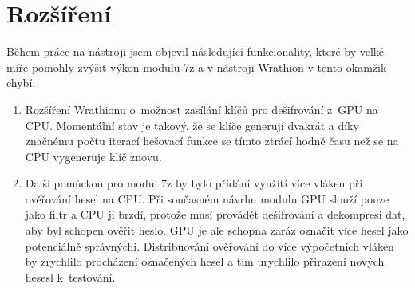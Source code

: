 \section{Rozšíření}
Během práce na nástroji jsem objevil následující funkcionality, které by velké míře pomohly
zvýšit výkon modulu 7z a v nástroji Wrathion v tento okamžik chybí.
\begin{enumerate}
   \item Rozšíření Wrathionu o~možnost zasílání klíčů pro dešifrování z~GPU na CPU. Momentální
       stav je takový, že se klíče generují dvakrát a díky značnému počtu iterací hešovací funkce
       se tímto ztrácí hodně času než se na CPU vygeneruje klíč znovu.
    \item Další pomůckou pro modul 7z by bylo přídání využítí více vláken při ověřování hesel na
	CPU. Při současném návrhu modulu GPU slouží pouze jako filtr a CPU ji brzdí, protože musí
	provádět dešifrování a dekompresi dat, aby byl schopen ověřit heslo. GPU je ale schopna
	zaráz označit více hesel jako potenciálně správnýchi. Distribuování ověřování do
	více výpočetních vláken by zrychlilo procházení označených hesel a tím urychlilo
	přirazení nových hesesl k~testování.
\end{enumerate}


